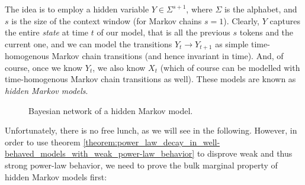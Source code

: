 \documentclass[../../main.tex]{subfiles}
\begin{document}
    The idea is to employ a hidden variable $Y \in \Sigma ^{s+1}$, where $\Sigma$ is the alphabet, and $s$ is the size of the context window (for Markov chains $s = 1$). Clearly, $Y$ captures the entire \emph{state} at time $t$ of our model, that is all the previous $s$ tokens and the current one, and we can model the transitions $Y_t \to Y_{t + 1}$ as simple time-homogenous Markov chain transitions (and hence invariant in time). And, of course, once we know $Y_t$, we also know $X_t$ (which of course can be modelled with time-homogenous Markov chain transitions as well). These models are known as \emph{hidden Markov models}.

    \begin{figure}[h]
        \center
        \caption{Bayesian network of a hidden Markov model.}
        \label{fig:bayesian_network_hidden_markov}
    \end{figure}

    \bigskip
    Unfortunately, there is no free lunch, as we will see in the following. However, in order to use theorem \ref{theorem:power_law_decay_in_well-behaved_models_with_weak_power-law_behavior} to disprove weak and thus strong power-law behavior, we need to prove the bulk marginal property of hidden Markov models first:
 
\end{document}
